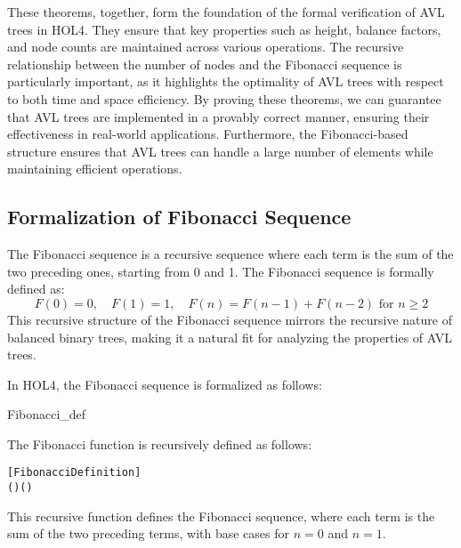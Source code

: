 These theorems, together, form the foundation of the formal verification of AVL trees in HOL4. They ensure that key properties such as height, balance factors, and node counts are maintained across various operations. The recursive relationship between the number of nodes and the Fibonacci sequence is particularly important, as it highlights the optimality of AVL trees with respect to both time and space efficiency. By proving these theorems, we can guarantee that AVL trees are implemented in a provably correct manner, ensuring their effectiveness in real-world applications. Furthermore, the Fibonacci-based structure ensures that AVL trees can handle a large number of elements while maintaining efficient operations.

\subsection{Formalization of Fibonacci Sequence}

    The Fibonacci sequence is a recursive sequence where each term is the sum of the two preceding ones, starting from 0 and 1. The Fibonacci sequence is formally defined as:
    \[
    F(0) = 0, \quad F(1) = 1, \quad F(n) = F(n-1) + F(n-2) \text{ for } n \geq 2
    \]
    This recursive structure of the Fibonacci sequence mirrors the recursive nature of balanced binary trees, making it a natural fit for analyzing the properties of AVL trees.

    In HOL4, the Fibonacci sequence is formalized as follows:
   \begin{defn}{Fibonacci\_def}

    The Fibonacci function is recursively defined as follows:

     \begin{alltt}
[Fibonacci Definition]
  \HOLTokenDefEquality{}
    \HOLSymConst{=}   
     \HOLSymConst{=}   
    ( \HOLSymConst{\ensuremath{-}} ) \HOLSymConst{\ensuremath{+}}  ( \HOLSymConst{\ensuremath{-}} )
     \end{alltt}
     

    This recursive function defines the Fibonacci sequence, where each term is the sum of the two preceding terms, with base cases for \( n = 0 \) and \( n = 1 \).
    \end{defn}


